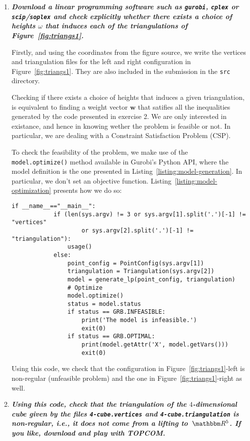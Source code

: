 \begin{enumerate}
  \item
      \textbf{\textit{Download a linear programming software such as \texttt{gurobi}, \texttt{cplex} or \texttt{scip}/\texttt{soplex} and check explicitly whether there exists a choice of heights $\omega$ that induces each of the triangulations of Figure~\ref{fig:triangs1}.}}

        Firstly, and using the coordinates from the figure source, we write the vertices and triangulation files for the left and right configuration in Figure~\ref{fig:triangs1}.
        They are also included in the submission in the \texttt{src} directory.

        Checking if there exists a choice of heights that induces a given triangulation, is equivalent to finding a weight vector $\pmb{w}$ that satifies all the inequalities generated by the code presented in exercise 2.
        We are only interested in existance, and hence in knowing wether the problem is feasible or not.
        In particular, we are dealing with a Constraint Satisfaction Problem (CSP).

        To check the feasibility of the problem, we make use of the \texttt{model.optimize()} method available in Gurobi's Python API, where the model definition is the one presented in Listing~\ref{listing:model-generation}.
        In particular, we don't set an objective function.
        Listing~\ref{listing:model-optimization} presents how we do so:
        \begin{lstlisting}[style=python,caption={Model definition and optimization.\label{listing:model-optimization}}]
        if __name__=="__main__":
            if (len(sys.argv) != 3 or sys.argv[1].split('.')[-1] != "vertices"
                    or sys.argv[2].split('.')[-1] != "triangulation"):
                usage()
            else:
                point_config = PointConfig(sys.argv[1])
                triangulation = Triangulation(sys.argv[2])
                model = generate_lp(point_config, triangulation)
                # Optimize
                model.optimize()
                status = model.status
                if status == GRB.INFEASIBLE:
                    print('The model is infeasible.')
                    exit(0)
                if status == GRB.OPTIMAL:
                    print(model.getAttr('X', model.getVars()))
                    exit(0)
        \end{lstlisting}

        Using this code, we check that the configuration in Figure~\ref{fig:triangs1}-left is non-regular (unfeasible problem) and the one in Figure~\ref{fig:triangs1}-right as well.
  \item
      \textbf{\textit{Using this code, check that the triangulation of the $4$-dimensional cube given by the files \texttt{4-cube.vertices} and \texttt{4-cube.triangulation} is non-regular, i.e., it does not come from a lifting to~$\RR^5$. If you like, download and play with TOPCOM.}}


\end{enumerate}
